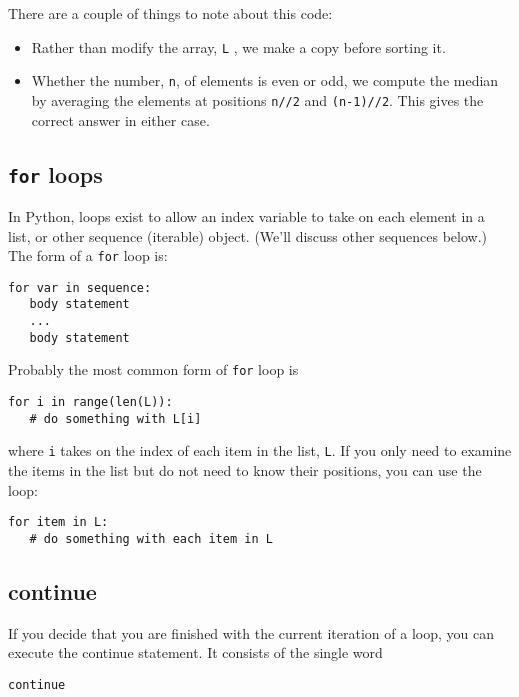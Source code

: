 There are a couple of things to
note about this code:

\begin{itemize}

\item
  Rather than modify the array, \texttt{L} , we make a copy before sorting it.
\item
  Whether the number, \texttt{n}, of
  elements is even or odd, we compute the median by averaging the
  elements at positions \texttt{n//2} and \texttt{(n-1)//2}. This gives the
  correct answer in either case.
\end{itemize}

\subsection{\texttt{for} loops}

In Python, loops exist
to allow an index variable to take on each element in a list, or other
sequence (iterable) object. (We'll discuss other sequences below.) The form of a
\texttt{for} loop is:

\begin{verbatim}
for var in sequence:
   body statement
   ...
   body statement  
\end{verbatim}

Probably the most common form of \texttt{for} loop is

\begin{verbatim}
for i in range(len(L)):
   # do something with L[i]  
\end{verbatim}

where \texttt{i} takes on the index
of each item in the list, \texttt{L}. If you only need to examine the
items in the list but do not need to know their positions, you can use
the loop:

\begin{verbatim}
for item in L:
   # do something with each item in L
\end{verbatim}

\subsection{continue}

If you decide that you are finished
with the current iteration of a loop, you can execute the continue
statement. It consists of the single word

\begin{verbatim}
continue  
\end{verbatim}

